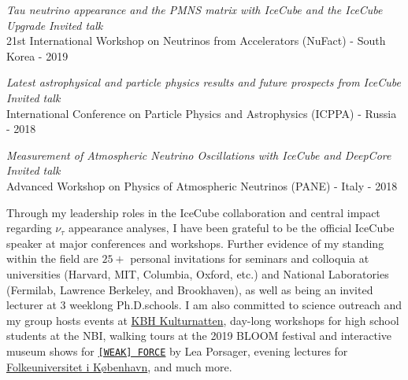 \documentclass[a4paper,11pt]{article}
\begin{document}
{\it Tau neutrino appearance and the PMNS matrix with IceCube and the IceCube Upgrade} \hfill {\em Invited talk} \\ 
 21st International Workshop on Neutrinos from Accelerators (NuFact) - South Korea - 2019


{\it Latest astrophysical and particle physics results and future prospects from IceCube} \hfill {\em Invited talk} \\ 
 International Conference on Particle Physics and Astrophysics (ICPPA) - Russia - 2018

{\it Measurement of Atmospheric Neutrino Oscillations with IceCube and DeepCore} \hfill {\em Invited talk} \\ 
 Advanced Workshop on Physics of Atmospheric Neutrinos (PANE) - Italy - 2018
 
 
 


Through my leadership roles in the IceCube collaboration and central impact regarding $\nu_\tau$ appearance analyses, I have been grateful to be the official IceCube speaker at major conferences and workshops. Further evidence of my standing within the field are $25+$ personal invitations for seminars and colloquia at universities (Harvard, MIT, Columbia, Oxford, etc.) and National Laboratories (Fermilab, Lawrence Berkeley, and Brookhaven), as well as being an invited lecturer at $3$ weeklong Ph.D.\@ schools. I am also committed to science outreach and my group hosts events at \href{https://www.kulturnatten.dk/da/Kulturnatten}{KBH Kulturnatten}, day-long workshops for high school students at the NBI, walking tours at the 2019 BLOOM festival and interactive museum shows for \href{https://samtidskunst.dk/sites/default/files/press/pressemeddelelse_uk_weak_force.pdf}{\texttt{[WEAK] FORCE}} by Lea Porsager, evening lectures for \href{https://nbia.nbi.ku.dk/calendar/past/public/}{Folkeuniversitet i K{\o}benhavn}, and much more.
\end{document}
